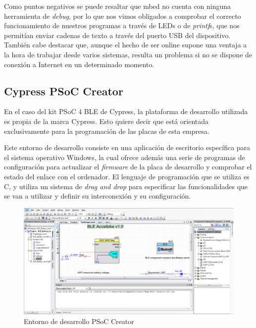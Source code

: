 Como puntos negativos se puede resaltar que mbed no cuenta con ninguna herramienta de \textit{debug}, por lo que nos vimos obligados a comprobar el correcto funcionamiento de nuestros programas a través de LEDs o de \textit{printf}s, que nos permitían enviar cadenas de texto a través del puerto USB del dispositivo. También cabe destacar que, aunque el hecho de ser online supone una ventaja a la hora de trabajar desde varios sistemas, resulta un problema si no se dispone de conexión a Internet en un determinado momento.

\subsection{Cypress PSoC Creator}
\label{explicacionPSoCCreator}

En el caso del kit PSoC 4 BLE de Cypress, la plataforma de desarrollo utilizada es propia de la marca Cypress. Esto quiere decir que está orientada exclusivamente para la programación de las placas de esta empresa.

Este entorno de desarrollo consiste en una aplicación de escritorio específica para el sistema operativo Windows, la cual ofrece además una serie de programas de configuración para actualizar el \textit{firmware} de la placa de desarrollo y comprobar el estado del enlace con el ordenador. El lenguaje de programación que se utiliza es C, y utiliza un sistema de \textit{drag and drop} para especificar las funcionalidades que se van a utilizar y definir su interconexión y su configuración. \\

\begin{figure}[h]%
	\centering 	
    \includegraphics[width=\textwidth]{figures/psoc_compilador.PNG} %
   	\caption[Entorno de desarrollo PSoC Creator]{Entorno de desarrollo PSoC Creator}
   	\label{figuraPSoCCreator}
\end{figure}

